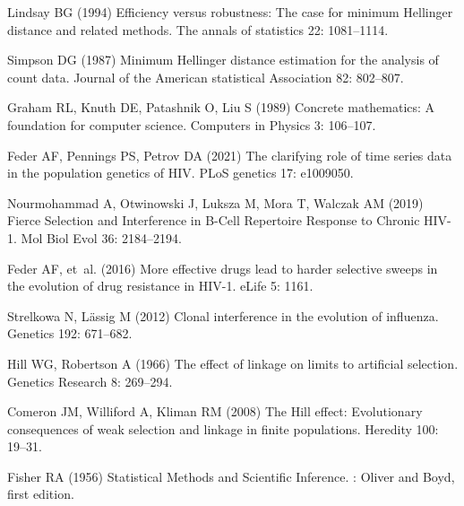 \documentclass[11pt]{article}
\begin{document}
{\begin{thebibliography}{10}
Lindsay BG (1994) Efficiency versus robustness: The case for minimum
  {{Hellinger}} distance and related methods.
\newblock The annals of statistics 22: 1081--1114.

Simpson DG (1987) Minimum {{Hellinger}} distance estimation for the analysis of
  count data.
\newblock Journal of the American statistical Association 82: 802--807.

Graham RL, Knuth DE, Patashnik O, Liu S (1989) Concrete mathematics: A
  foundation for computer science.
\newblock Computers in Physics 3: 106--107.

Feder AF, Pennings PS, Petrov DA (2021) The clarifying role of time series data
  in the population genetics of {{HIV}}.
\newblock PLoS genetics 17: e1009050.

Nourmohammad A, Otwinowski J, Luksza M, Mora T, Walczak AM (2019) {Fierce
  Selection and Interference in B-Cell Repertoire Response to Chronic HIV-1.}
\newblock Mol Biol Evol 36: 2184--2194.

Feder AF, et~al. (2016) {More effective drugs lead to harder selective sweeps
  in the evolution of drug resistance in HIV-1.}
\newblock eLife 5: 1161.

Strelkowa N, L{\"a}ssig M (2012) {Clonal interference in the evolution of
  influenza.}
\newblock Genetics 192: 671--682.

Hill WG, Robertson A (1966) The effect of linkage on limits to artificial
  selection.
\newblock Genetics Research 8: 269--294.

Comeron JM, Williford A, Kliman RM (2008) The {{Hill}}
  effect: Evolutionary consequences of weak selection and linkage in finite
  populations.
\newblock Heredity 100: 19--31.

Fisher RA (1956) Statistical Methods and Scientific Inference.
: {Oliver and Boyd}, first edition.


\end{thebibliography}}
\end{document}
